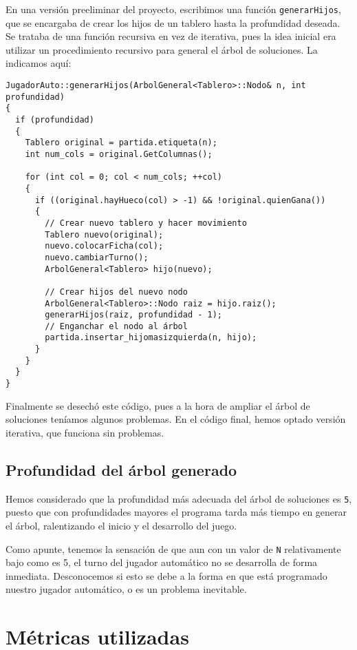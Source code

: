 \documentclass[11pt]{article}
\begin{document}
En una versión preeliminar del proyecto, escribimos una función \texttt{generarHijos}, que se encargaba de crear los hijos de un tablero hasta la profundidad deseada. Se trataba de una función recursiva en vez de iterativa, pues la idea inicial era utilizar un procedimiento recursivo para general el árbol de soluciones. La indicamos aquí:

\begin{verbatim}
JugadorAuto::generarHijos(ArbolGeneral<Tablero>::Nodo& n, int profundidad)
{
  if (profundidad)
  {
    Tablero original = partida.etiqueta(n);
    int num_cols = original.GetColumnas();

    for (int col = 0; col < num_cols; ++col)
    {
      if ((original.hayHueco(col) > -1) && !original.quienGana())
      {
        // Crear nuevo tablero y hacer movimiento
        Tablero nuevo(original);
        nuevo.colocarFicha(col);
        nuevo.cambiarTurno();
        ArbolGeneral<Tablero> hijo(nuevo);

        // Crear hijos del nuevo nodo
        ArbolGeneral<Tablero>::Nodo raiz = hijo.raiz();
        generarHijos(raiz, profundidad - 1);
        // Enganchar el nodo al árbol
        partida.insertar_hijomasizquierda(n, hijo);
      }
    }
  }
}
\end{verbatim}

Finalmente se desechó este código, pues a la hora de ampliar el árbol de soluciones teníamos algunos problemas. En el código final, hemos optado versión iterativa, que funciona sin problemas.

\subsection{Profundidad del árbol generado}
\label{sec-1-4}

Hemos considerado que la profundidad más adecuada del árbol de soluciones es \texttt{5},
puesto que con profundidades mayores el programa tarda más tiempo en generar el
árbol, ralentizando el inicio y el desarrollo del juego.

Como apunte, tenemos la sensación de que aun con un valor de \texttt{N} relativamente bajo como es 5, el turno del jugador automático no se desarrolla de forma inmediata. Desconocemos si esto se debe a la forma en que está programado nuestro jugador automático, o es un problema inevitable.

\section{Métricas utilizadas}
\label{sec-2}
\end{document}
